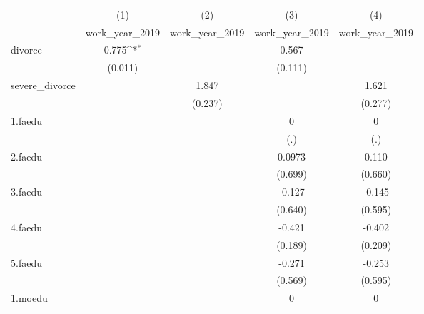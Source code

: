 {
\def\sym#1{\ifmmode^{#1}\else\(^{#1}\)\fi}
\begin{tabular}{l*{4}{c}}
\hline\hline
            &\multicolumn{1}{c}{(1)}&\multicolumn{1}{c}{(2)}&\multicolumn{1}{c}{(3)}&\multicolumn{1}{c}{(4)}\\
            &\multicolumn{1}{c}{work\_year\_2019}&\multicolumn{1}{c}{work\_year\_2019}&\multicolumn{1}{c}{work\_year\_2019}&\multicolumn{1}{c}{work\_year\_2019}\\
\hline
divorce     &       0.775\sym{*}  &                     &       0.567         &                     \\
            &     (0.011)         &                     &     (0.111)         &                     \\
[1em]
severe\_divorce&                     &       1.847         &                     &       1.621         \\
            &                     &     (0.237)         &                     &     (0.277)         \\
[1em]
1.faedu     &                     &                     &           0         &           0         \\
            &                     &                     &         (.)         &         (.)         \\
[1em]
2.faedu     &                     &                     &      0.0973         &       0.110         \\
            &                     &                     &     (0.699)         &     (0.660)         \\
[1em]
3.faedu     &                     &                     &      -0.127         &      -0.145         \\
            &                     &                     &     (0.640)         &     (0.595)         \\
[1em]
4.faedu     &                     &                     &      -0.421         &      -0.402         \\
            &                     &                     &     (0.189)         &     (0.209)         \\
[1em]
5.faedu     &                     &                     &      -0.271         &      -0.253         \\
            &                     &                     &     (0.569)         &     (0.595)         \\
[1em]
1.moedu     &                     &                     &           0         &           0         \\

\end{tabular}}

